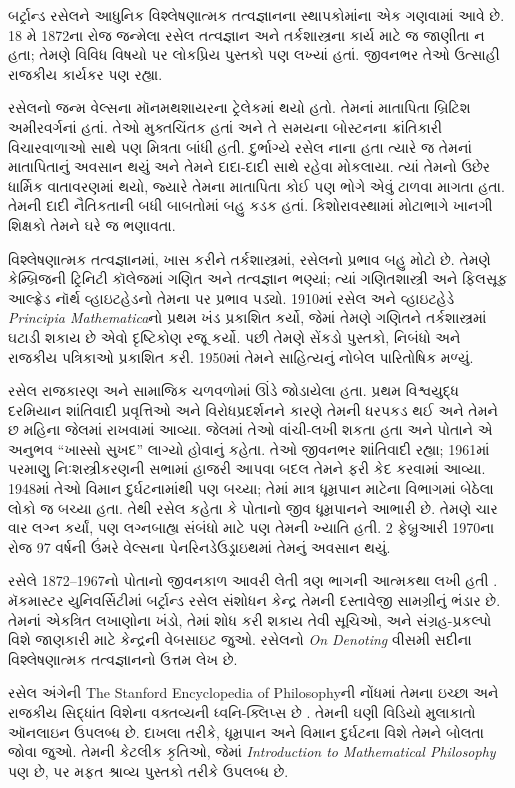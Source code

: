 
બર્ટ્રાન્ડ રસેલને આધુનિક
વિશ્લેષણાત્મક તત્વજ્ઞાનના
સ્થાપકોમાંના એક ગણવામાં
આવે છે. 18 મે 1872ના રોજ
જન્મેલા રસેલ તત્વજ્ઞાન અને
તર્કશાસ્ત્રના કાર્ય માટે
જ જાણીતા ન હતા; તેમણે
વિવિધ વિષયો પર લોકપ્રિય
પુસ્તકો પણ લખ્યાં હતાં.
જીવનભર તેઓ ઉત્સાહી
રાજકીય કાર્યકર પણ રહ્યા.

રસેલનો જન્મ વેલ્સના
મૉનમથશાયરના ટ્રેલેકમાં
થયો હતો. તેમનાં માતાપિતા
બ્રિટિશ અમીરવર્ગનાં હતાં.
તેઓ મુક્તચિંતક હતાં અને
તે સમયના બોસ્ટનના
ક્રાંતિકારી વિચારવાળાઓ
સાથે પણ મિત્રતા બાંધી
હતી. દુર્ભાગ્યે રસેલ
નાના હતા ત્યારે જ
તેમનાં માતાપિતાનું
અવસાન થયું અને
તેમને દાદા-દાદી
સાથે રહેવા મોકલાયા.
ત્યાં તેમનો ઉછેર
ધાર્મિક વાતાવરણમાં
થયો, જ્યારે તેમના
માતાપિતા કોઈ પણ
ભોગે એવું ટાળવા
માગતા હતા. તેમની
દાદી નૈતિકતાની
બધી બાબતોમાં બહુ
કડક હતાં. કિશોરાવસ્થામાં
મોટાભાગે ખાનગી
શિક્ષકો તેમને ઘરે
જ ભણાવતા.

વિશ્લેષણાત્મક તત્વજ્ઞાનમાં,
ખાસ કરીને તર્કશાસ્ત્રમાં,
રસેલનો પ્રભાવ બહુ મોટો
છે. તેમણે કેમ્બ્રિજની
ટ્રિનિટી કૉલેજમાં
ગણિત અને તત્વજ્ઞાન
ભણ્યાં; ત્યાં ગણિતશાસ્ત્રી
અને ફિલસૂફ આલ્ફ્રેડ
નૉર્થ વ્હાઇટહેડનો
તેમના પર પ્રભાવ
પડ્યો. 1910માં રસેલ
અને વ્હાઇટહેડે
\emph{Principia Mathematica}નો
પ્રથમ ખંડ પ્રકાશિત
કર્યો, જેમાં તેમણે
ગણિતને તર્કશાસ્ત્રમાં
ઘટાડી શકાય છે એવો
દૃષ્ટિકોણ રજૂ કર્યો.
પછી તેમણે સેંકડો
પુસ્તકો, નિબંધો અને
રાજકીય પત્રિકાઓ
પ્રકાશિત કરી. 1950માં
તેમને સાહિત્યનું
નોબેલ પારિતોષિક મળ્યું.

રસેલ રાજકારણ અને
સામાજિક ચળવળોમાં
ઊંડે જોડાયેલા હતા.
પ્રથમ વિશ્વયુદ્ધ
દરમિયાન શાંતિવાદી
પ્રવૃત્તિઓ અને
વિરોધપ્રદર્શનને
કારણે તેમની
ધરપકડ થઈ અને
તેમને છ મહિના
જેલમાં રાખવામાં
આવ્યા. જેલમાં
તેઓ વાંચી-લખી
શકતા હતા અને
પોતાને એ અનુભવ
“ખાસ્સો સુખદ”
લાગ્યો હોવાનું
કહેતા. તેઓ જીવનભર
શાંતિવાદી રહ્યા;
1961માં પરમાણુ
નિઃશસ્ત્રીકરણની
સભામાં હાજરી
આપવા બદલ તેમને
ફરી કેદ કરવામાં
આવ્યા. 1948માં
તેઓ વિમાન દુર્ઘટનામાંથી
પણ બચ્યા; તેમાં
માત્ર ધૂમ્રપાન
માટેના વિભાગમાં
બેઠેલા લોકો જ
બચ્યા હતા. તેથી
રસેલ કહેતા કે
પોતાનો જીવ
ધૂમ્રપાનને આભારી
છે. તેમણે ચાર
વાર લગ્ન કર્યાં,
પણ લગ્નબાહ્ય
સંબંધો માટે પણ
તેમની ખ્યાતિ હતી.
2 ફેબ્રુઆરી 1970ના
રોજ 97 વર્ષની
ઉંમરે વેલ્સના
પેનરિનડેઉડ્રાઇથમાં
તેમનું અવસાન થયું.

\begin{reading}
રસેલે 1872--1967નો
પોતાનો જીવનકાળ
આવરી લેતી ત્રણ
ભાગની આત્મકથા
લખી હતી
\citep{Russell1967,Russell1968,Russell1969}.
મૅકમાસ્ટર યુનિવર્સિટીમાં
બર્ટ્રાન્ડ રસેલ સંશોધન
કેન્દ્ર તેમની દસ્તાવેજી
સામગ્રીનું ભંડાર છે.
તેમનાં એકત્રિત લખાણોના
ખંડો, તેમાં શોધ કરી
શકાય તેવી સૂચિઓ,
અને સંગ્રહ-પ્રકલ્પો
વિશે જાણકારી માટે
કેન્દ્રની વેબસાઇટ
\citet{Duncan2015} જુઓ.
રસેલનો
\emph{On
  Denoting}
\citep{Russell1905}
વીસમી સદીના
વિશ્લેષણાત્મક
તત્વજ્ઞાનનો ઉત્તમ
લેખ છે.

રસેલ અંગેની
The Stanford Encyclopedia of Philosophyની
નોંધમાં તેમના
ઇચ્છા અને રાજકીય
સિદ્ધાંત વિશેના
વક્તવ્યની ધ્વનિ-ક્લિપ્સ
છે \citep{Irvine2015}.
તેમની ઘણી વિડિયો
મુલાકાતો ઑનલાઇન
ઉપલબ્ધ છે. દાખલા
તરીકે, ધૂમ્રપાન
અને વિમાન દુર્ઘટના
વિશે તેમને બોલતા
જોવા \citet{RussellND}
જુઓ. તેમની કેટલીક
કૃતિઓ, જેમાં
\emph{Introduction to Mathematical Philosophy}
પણ છે, \citet{LibriVoxND}
પર મફત શ્રાવ્ય
પુસ્તકો તરીકે
ઉપલબ્ધ છે.
\end{reading}
\endgroup


